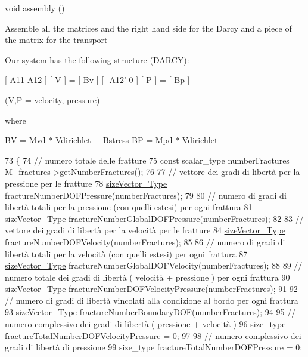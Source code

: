 void assembly () 

Assemble all the matrices and the right hand side for the Darcy and a piece of the matrix for the transport

Our system has the following structure (D\-A\-R\-C\-Y)\-:

\mbox{[} A11 A12 \mbox{]} \mbox{[} V \mbox{]} = \mbox{[} Bv \mbox{]} \mbox{[} -\/\-A12' 0 \mbox{]} \mbox{[} P \mbox{]} = \mbox{[} Bp \mbox{]}

(V,P = velocity, pressure)

where

B\-V = Mvd $\ast$ Vdirichlet + Bstress B\-P = Mpd $\ast$ Vdirichlet 
\begin{DoxyCode}
73 \{
74     \textcolor{comment}{// numero totale delle fratture}
75     \textcolor{keyword}{const} scalar\_type numberFractures = M\_fractures->getNumberFractures();
76     
77     \textcolor{comment}{// vettore dei gradi di libertà per la pressione per le fratture}
78     \hyperlink{Core_8h_a83c51913d041a5001e8683434c09857f}{sizeVector\_Type} fractureNumberDOFPressure(numberFractures);
79 
80     \textcolor{comment}{// numero di gradi di libertà totali per la pressione (con quelli estesi) per ogni frattura }
81     \hyperlink{Core_8h_a83c51913d041a5001e8683434c09857f}{sizeVector\_Type} fractureNumberGlobalDOFPressure(numberFractures);
82 
83     \textcolor{comment}{// vettore dei gradi di libertà per la velocità per le fratture}
84     \hyperlink{Core_8h_a83c51913d041a5001e8683434c09857f}{sizeVector\_Type} fractureNumberDOFVelocity(numberFractures);
85 
86     \textcolor{comment}{// numero di gradi di libertà totali per la velocità (con quelli estesi) per ogni frattura }
87     \hyperlink{Core_8h_a83c51913d041a5001e8683434c09857f}{sizeVector\_Type} fractureNumberGlobalDOFVelocity(numberFractures);
88 
89     \textcolor{comment}{// numero totale dei gradi di libertà ( velocità + pressione ) per ogni frattura}
90     \hyperlink{Core_8h_a83c51913d041a5001e8683434c09857f}{sizeVector\_Type} fractureNumberDOFVelocityPressure(numberFractures);
91 
92     \textcolor{comment}{// numero di gradi di libertà vincolati alla condizione al bordo per ogni frattura}
93     \hyperlink{Core_8h_a83c51913d041a5001e8683434c09857f}{sizeVector\_Type} fractureNumberBoundaryDOF(numberFractures);
94 
95     \textcolor{comment}{// numero complessivo dei gradi di libertà ( pressione + velocità ) }
96     size\_type fractureTotalNumberDOFVelocityPressure = 0;
97 
98     \textcolor{comment}{// numero complessivo dei gradi di libertà di pressione }
99     size\_type fractureTotalNumberDOFPressure = 0;

\end{DoxyCode}
